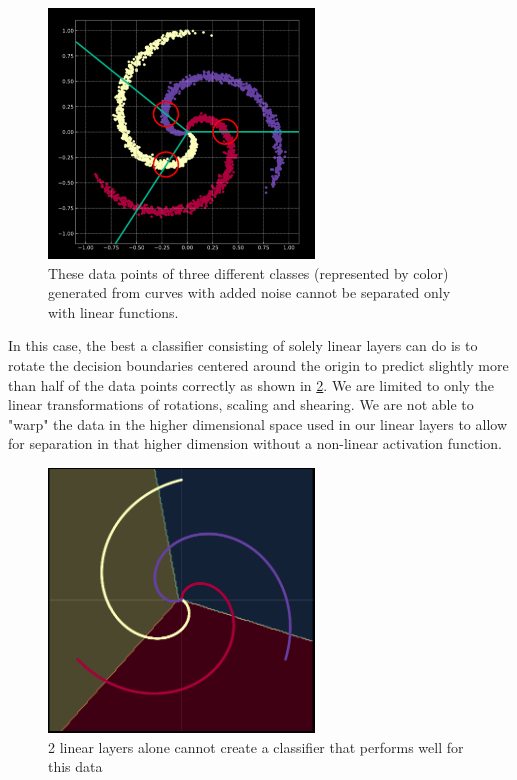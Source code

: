 \begin{figure}[ht]
    \centering
    \includegraphics[width=200pt]{labs/02/images/spiral2.png}
    \caption{These data points of three different classes (represented by color) generated from curves with added noise cannot be separated only with linear functions.}
    \label{fig:spiral_with_noise}
\end{figure}

In this case, the best a classifier consisting of solely linear layers can do is to rotate the decision boundaries centered around the origin to predict slightly more than half of the data points correctly as shown in \cref{fig:spiral_linear_classifier}.
We are limited to only the linear transformations of rotations, scaling and shearing.
We are not able to "warp" the data in the higher dimensional space used in our linear layers to allow for separation in that higher dimension without a non-linear activation function.

\begin{figure}[ht]
    \centering
    \includegraphics[width=200pt]{labs/02/images/linear.png}
    \caption{2 linear layers alone cannot create a classifier that performs well for this data}
    \label{fig:spiral_linear_classifier}
\end{figure}

